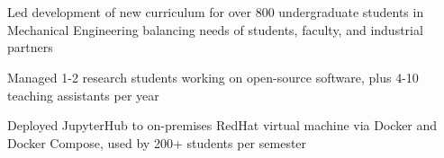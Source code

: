 \\
\\

\begin{tightemize}
\item Led development of new curriculum for over 800 undergraduate students in Mechanical Engineering balancing needs of students, faculty, and industrial partners
\item Managed 1-2 research students working on open-source software, plus 4-10 teaching assistants per year
\item Deployed JupyterHub to on-premises RedHat virtual machine via Docker and Docker Compose, used by 200+ students per semester
\end{tightemize}
\sectionsep

\\
\\

